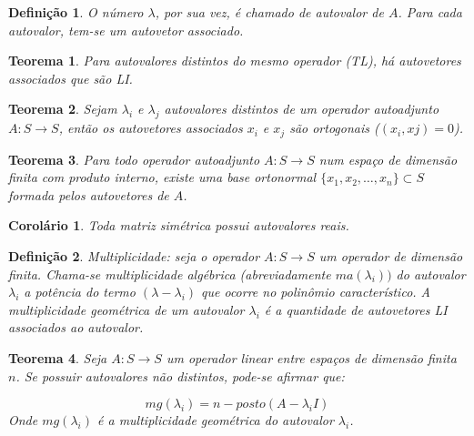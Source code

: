 \documentclass[a4paper,portuguese,9pt]{extarticle}
\newtheorem{theorem}{Teorema}[section]
\newtheorem*{definition}{Definição}
\newtheorem{corollary}{Corolário}[section]
\begin{document}
\begin{multicols*}{2}
\begin{definition}
O número $\lambda$, por sua vez, é chamado de autovalor de $A$. Para cada autovalor, tem-se um autovetor associado.

\end{definition}

\begin{theorem}
Para autovalores distintos do mesmo operador (TL), há autovetores associados que são LI.
\end{theorem}

\begin{theorem}
Sejam $\lambda_i$ e $\lambda_j$ autovalores distintos de um operador autoadjunto $A:S \rightarrow S$, então os autovetores associados $x_i$ e $x_j$ são ortogonais ($(x_i,xj)=0$).   
\end{theorem}

\begin{theorem}
Para todo operador autoadjunto $A:S \rightarrow S$ num espaço de dimensão finita com produto interno, existe uma base ortonormal $\{x_1,x_2,\ldots,x_n\} \subset S$ formada pelos autovetores de $A$.
\end{theorem}

\begin{corollary}
Toda matriz simétrica possui autovalores reais.
\end{corollary}

\begin{definition}
Multiplicidade: seja o operador $A: S \rightarrow S$ um operador de dimensão finita. Chama-se multiplicidade algébrica (abreviadamente $ma(\lambda_i))$ do autovalor $\lambda_i$ a potência do termo $(\lambda - \lambda_i)$ que ocorre no polinômio característico. A multiplicidade geométrica de um autovalor $\lambda_i$ é a quantidade de autovetores LI associados ao autovalor.
\end{definition}

\begin{theorem}
Seja $A: S \rightarrow S$ um operador linear entre espaços de dimensão finita $n$. Se possuir autovalores não distintos, pode-se afirmar que:

\begin{equation*}
    mg(\lambda_i) = n - posto(A-\lambda_i I)
\end{equation*}
Onde $mg(\lambda_i)$ é a multiplicidade geométrica do autovalor $\lambda_i$.
\end{theorem}

\end{multicols*}
\end{document}

